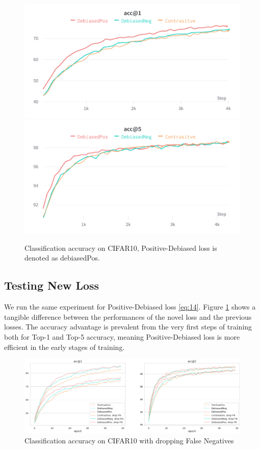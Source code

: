 \documentclass{article}
\begin{document}
\begin{figure}[!htb]
\includegraphics[width=\linewidth]{figures/3_losses.png}
\endminipage\hfill
{}
\includegraphics[width=\linewidth]{figures/3_losses_5.png}
\endminipage
\caption{Classification accuracy on CIFAR10, Positive-Debiased loss is denoted as debiasedPos.}
\label{fig:fig2}
\end{figure}

\subsection{Testing New Loss}
We run the same experiment for Positive-Debiased loss \ref{eq:14}. Figure \ref{fig:fig2} shows a tangible difference between the performances of the novel loss and the previous losses. The accuracy advantage is prevalent from the very first steps of training both for Top-1 and Top-5 accuracy, meaning Positive-Debiased loss is more efficient in the early stages of training.


\begin{figure}
\includegraphics[width=1\textwidth]{figures/base_vs_dropfn.png}
\caption{Classification accuracy on CIFAR10 with dropping False Negatives}
\label{fig:fig3}
\end{figure}
\end{document}
